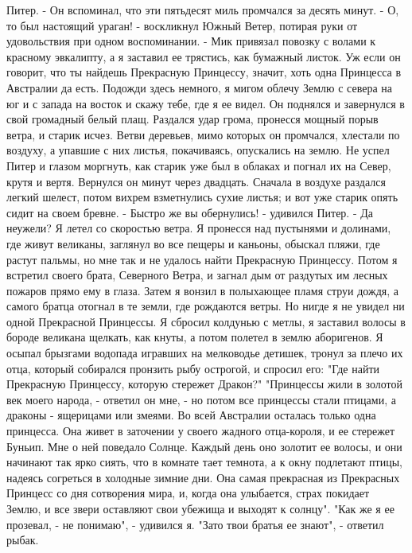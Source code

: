 Питер. - Он вспоминал, что эти пятьдесят миль промчался за десять 
минут.
    - О, то был настоящий ураган! - воскликнул Южный Ветер, потирая 
руки от удовольствия при одном воспоминании. - Мик привязал повозку с 
волами к красному эвкалипту, а я заставил ее трястись, как бумажный 
листок. Уж если он говорит, что ты найдешь Прекрасную Принцессу, 
значит, хоть одна Принцесса в Австралии да есть. Подожди здесь 
немного, я мигом облечу Землю с севера на юг и с запада на восток и 
скажу тебе, где я ее видел.
    Он поднялся и завернулся в свой громадный белый плащ. Раздался 
удар грома, пронесся мощный порыв ветра, и старик исчез. Ветви 
деревьев, мимо которых он промчался, хлестали по воздуху, а упавшие с 
них листья, покачиваясь, опускались на землю. Не успел Питер и глазом 
моргнуть, как старик уже был в облаках и погнал их на Север, крутя и 
вертя.
    Вернулся он минут через двадцать. Сначала в воздухе раздался 
легкий шелест, потом вихрем взметнулись сухие листья; и вот уже старик 
опять сидит на своем бревне.
    - Быстро же вы обернулись! - удивился Питер.
    - Да неужели? Я летел со скоростью ветра. Я пронесся над пустынями 
и долинами, где живут великаны, заглянул во все пещеры и каньоны, 
обыскал пляжи, где растут пальмы, но мне так и не удалось найти 
Прекрасную Принцессу. Потом я встретил своего брата, Северного Ветра, 
и загнал дым от раздутых им лесных пожаров прямо ему в глаза. Затем я 
вонзил в полыхающее пламя струи дождя, а самого братца отогнал в те 
земли, где рождаются ветры. Но нигде я не увидел ни одной Прекрасной 
Принцессы. Я сбросил колдунью с метлы, я заставил волосы в бороде 
великана щелкать, как кнуты, а потом полетел в землю аборигенов. Я 
осыпал брызгами водопада игравших на мелководье детишек, тронул за 
плечо их отца, который собирался пронзить рыбу острогой, и спросил 
его: "Где найти Прекрасную Принцессу, которую стережет Дракон?"
    "Принцессы жили в золотой век моего народа, - ответил он мне, - но 
потом все принцессы стали птицами, а драконы - ящерицами или змеями. 
Во всей Австралии осталась только одна принцесса. Она живет в 
заточении у своего жадного отца-короля, и ее стережет Буньип. Мне о 
ней поведало Солнце. Каждый день оно золотит ее волосы, и они начинают 
так ярко сиять, что в комнате тает темнота, а к окну подлетают птицы, 
надеясь согреться в холодные зимние дни. Она самая прекрасная из 
Прекрасных Принцесс со дня сотворения мира, и, когда она улыбается, 
страх покидает Землю, и все звери оставляют свои убежища и выходят к 
солнцу".
    "Как же я ее прозевал, - не понимаю", - удивился я.
    "Зато твои братья ее знают", - ответил рыбак.
